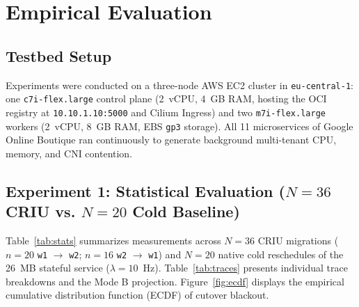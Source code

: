 \documentclass[conference,10pt]{IEEEtran}
\begin{document}
\section{Empirical Evaluation}

\subsection{Testbed Setup}
Experiments were conducted on a three-node AWS EC2 cluster in \texttt{eu-central-1}: one \texttt{c7i-flex.large} control plane (2~vCPU, 4~GB RAM, hosting the OCI registry at \texttt{10.10.1.10:5000} and Cilium Ingress) and two \texttt{m7i-flex.large} workers (2~vCPU, 8~GB RAM, EBS \texttt{gp3} storage). All 11 microservices of Google Online Boutique ran continuously to generate background multi-tenant CPU, memory, and CNI contention.

\subsection{Experiment 1: Statistical Evaluation ($N = 36$ CRIU vs. $N = 20$ Cold Baseline)}
Table~\ref{tab:stats} summarizes measurements across $N = 36$ CRIU migrations ($n = 20$ \texttt{w1} $\to$ \texttt{w2}; $n = 16$ \texttt{w2} $\to$ \texttt{w1}) and $N = 20$ native cold reschedules of the 26~MB stateful service ($\lambda = 10$~Hz). Table~\ref{tab:traces} presents individual trace breakdowns and the Mode B projection. Figure~\ref{fig:ecdf} displays the empirical cumulative distribution function (ECDF) of cutover blackout.
\end{document}
